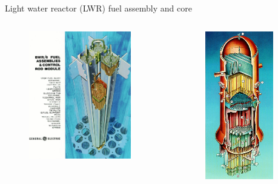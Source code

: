 \documentclass{beamer}
\begin{document}
    \begin{frame}{Light water reactor (LWR) fuel assembly and core}

        \begin{columns}[T]

            \begin{column}{0.5\textwidth}
                \begin{figure}
                    \centering
                    \includegraphics[width=12em]{./img/bwrFuel.png}
                    \caption*{}
                \end{figure}
            \end{column}

            \begin{column}{0.5\textwidth}
                \begin{figure}
                    \centering
                    \includegraphics[width=8em]{./img/bwrCore.png}
                    \caption*{}
                \end{figure}
            \end{column}

        \end{columns}

    \end{frame}
\end{document}
